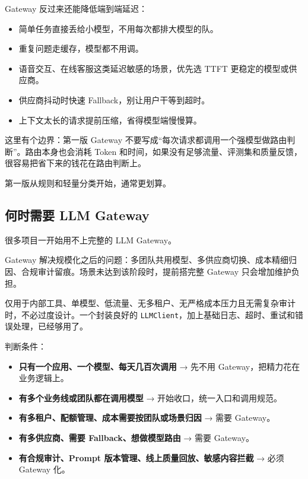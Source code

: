 \documentclass[9pt,a4paper,twocolumn]{ctexart}
\begin{document}
Gateway 反过来还能降低端到端延迟：


\begin{itemize}[itemsep=1pt, topsep=2pt]
  \item 简单任务直接丢给小模型，不用每次都排大模型的队。
  \item 重复问题走缓存，模型都不用调。
  \item 语音交互、在线客服这类延迟敏感的场景，优先选 TTFT 更稳定的模型或供应商。
  \item 供应商抖动时快速 Fallback，别让用户干等到超时。
  \item 上下文太长的请求提前压缩，省得模型端慢慢算。
\end{itemize}


这里有个边界：第一版 Gateway 不要写成“每次请求都调用一个强模型做路由判断”。路由本身也会消耗 Token 和时间，如果没有足够流量、评测集和质量反馈，很容易把省下来的钱花在路由判断上。



第一版从规则和轻量分类开始，通常更划算。



\subsection*{何时需要 LLM Gateway}


很多项目一开始用不上完整的 LLM Gateway。



Gateway 解决规模化之后的问题：多团队共用模型、多供应商切换、成本精细归因、合规审计留痕。场景未达到该阶段时，提前搭完整 Gateway 只会增加维护负担。



仅用于内部工具、单模型、低流量、无多租户、无严格成本压力且无需复杂审计时，不必过度设计。一个封装良好的 \texttt{LLMClient}，加上基础日志、超时、重试和错误处理，已经够用了。



判断条件：


\begin{itemize}[itemsep=1pt, topsep=2pt]
  \item \textbf{只有一个应用、一个模型、每天几百次调用} → 先不用 Gateway，把精力花在业务逻辑上。
  \item \textbf{有多个业务线或团队都在调用模型} → 开始收口，统一入口和调用规范。
  \item \textbf{有多租户、配额管理、成本需要按团队或场景归因} → 需要 Gateway。
  \item \textbf{有多供应商、需要 Fallback、想做模型路由} → 需要 Gateway。
  \item \textbf{有合规审计、Prompt 版本管理、线上质量回放、敏感内容拦截} → 必须 Gateway 化。
\end{itemize}
\end{document}
